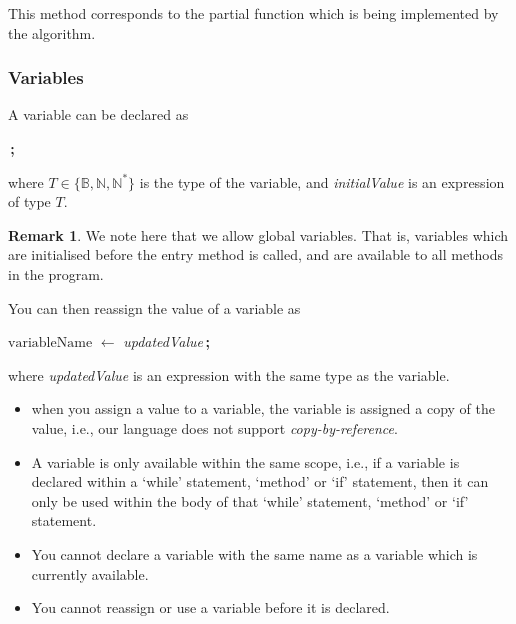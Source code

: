 \documentclass[11pt,a4paper,reqno]{amsart}
\newcommand{\Assign}[2]{\Let{#1 $\gets$ #2}}
\newcommand{\Reassign}[2]{#1 $\gets$ #2}
\newcommand{\EOL}{\,\textbf{;}\;}
\theoremstyle{plain}
\theoremstyle{definition}
\theoremstyle{definition}
\newtheorem{remark}[theorem]{Remark}
\begin{document}
\begin{algorithm}[H]
\end{algorithm}

\noindent
This method corresponds to the partial function which is being implemented by the algorithm.

\subsubsection{Variables}

A variable can be declared as

\begin{algorithm}[H]
  \Assign{$\mathrm{variableName}\colon T$}{\textit{initialValue}}\EOL
\end{algorithm}

\noindent
where $T \in \{\mathbb B,\mathbb N, \mathbb N^*\}$ is the type of the variable, and \textit{initialValue} is an expression of type $T$.

\begin{remark}
  We note here that we allow global variables.
  That is, variables which are initialised before the entry method is called, and are available to all methods in the program. 
\end{remark}

You can then reassign the value of a variable as

\begin{algorithm}[H]
  \Reassign{$\mathrm{variableName}$}{\textit{updatedValue}}\EOL
\end{algorithm}

\noindent
where \textit{updatedValue} is an expression with the same type as the variable.

\begin{itemize}[leftmargin=2em]
  \item
    when you assign a value to a variable, the variable is assigned a copy of the value, i.e., our language does not support \emph{copy-by-reference}.

  \item
A variable is only available within the same scope, i.e., if a variable is declared within a `while' statement, `method' or `if' statement, then it can only be used within the body of that `while' statement, `method' or `if' statement.
\item
You cannot declare a variable with the same name as a variable which is currently available.
\item You cannot reassign or use a variable before it is declared.
\end{itemize}
\end{document}
